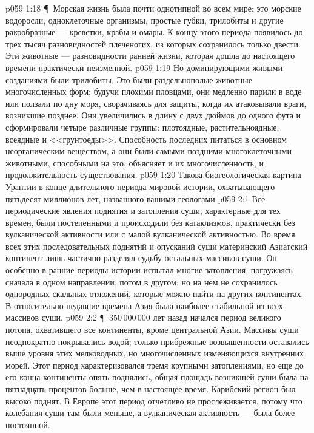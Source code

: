 \vs p059 1:18 \P\ Морская жизнь была почти однотипной во всем мире: это морские водоросли, одноклеточные организмы, простые губки, трилобиты и другие ракообразные --- креветки, крабы и омары. К концу этого периода появилось до трех тысяч разновидностей плеченогих, из которых сохранилось только двести. Эти животные --- разновидности ранней жизни, которая дошла до настоящего времени практически неизменной.
\vs p059 1:19 Но доминирующими живыми созданиями были трилобиты. Это были раздельнополые животные многочисленных форм; будучи плохими пловцами, они медленно парили в воде или ползали по дну моря, сворачиваясь для защиты, когда их атаковывали враги, возникшие позднее. Они увеличились в длину с двух дюймов до одного фута и сформировали четыре различные группы: плотоядные, растительноядные, всеядные и <<грунтоеды>>. Способность последних питаться в основном неорганическим веществом, а они были самыми поздними многоклеточными животными, способными на это, объясняет и их многочисленность, и продолжительность существования.
\vs p059 1:20 Такова биогеологическая картина Урантии в конце длительного периода мировой истории, охватывающего пятьдесят миллионов лет, названного вашими геологами 
\vs p059 2:1 Все периодические явления поднятия и затопления суши, характерные для тех времен, были постепенными и происходили без катаклизмов, практически без вулканической активности или с малой вулканической активностью. Во время всех этих последовательных поднятий и опусканий суши материнский Азиатский континент лишь частично разделял судьбу остальных массивов суши. Он особенно в ранние периоды истории испытал многие затопления, погружаясь сначала в одном направлении, потом в другом; но на нем не сохранилось однородных скальных отложений, которые можно найти на других континентах. В относительно недавние времена Азия была наиболее стабильной из всех массивов суши.
\vs p059 2:2 \P\ 350\,000\,000 лет назад начался период великого потопа, охватившего все континенты, кроме центральной Азии. Массивы суши неоднократно покрывались водой; только прибрежные возвышенности оставались выше уровня этих мелководных, но многочисленных изменяющихся внутренних морей. Этот период характеризовался тремя крупными затоплениями, но еще до его конца континенты опять поднялись, общая площадь возникшей суши была на пятнадцать процентов больше, чем в настоящее время. Карибский регион был высоко поднят. В Европе этот период отчетливо не прослеживается, потому что колебания суши там были меньше, а вулканическая активность --- была более постоянной.
